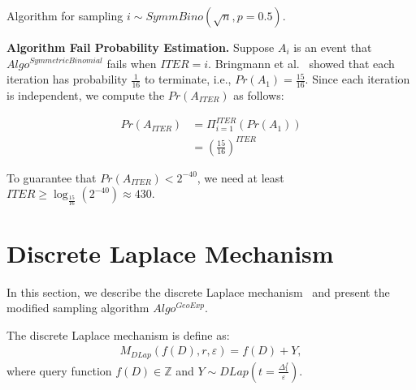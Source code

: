 \begin{algorithm}[tbh!]
{{            \\
            \\
            \\
            \\
            \\
        }}
    \caption{Algorithm for sampling $i\sim SymmBino\left(\sqrt{n} ,p=0.5\right) $.}
    \label{algo:SymmetricBinomialLargeN}
\end{algorithm}
\FloatBarrier

\textbf{Algorithm Fail Probability Estimation. }
Suppose $A_i$ is an event that $Algo^{SymmetricBinomial}$ fails when $ITER=i$.
Bringmann et al.~\cite{Bringmann2014InternalDE} showed that each iteration has probability $\frac{1}{16} $ to terminate, i.e., $Pr\left(A_1\right)=\frac{15}{16} $.
Since each iteration is independent, we compute the $Pr\left(A_{ITER}\right)$ as follows:

\begin{equation}
    \begin{split}
        Pr\left(A_{ITER}\right) &  =  \Pi _{i=1}^{ITER}\left(Pr\left(A_1\right) \right) \\
        &=\left(\frac{15}{16}\right)^{ITER}
    \end{split}
\end{equation}

To guarantee that $Pr\left(A_{ITER}\right)<2^{-40}$, we need at least $ITER\geq \log _\frac{15}{16}\left(2^{-40}\right)\approx 430$.

\section{Discrete Laplace Mechanism}
\label{sec:discreteLaplacemechanism}

In this section, we describe the discrete Laplace mechanism~\cite{chan2012privacy, ghosh2012universally,eigner2014differentially,canonne2020discrete} and present the modified sampling algorithm $Algo^{GeoExp}$.

The discrete Laplace mechanism is define as:
\begin{equation}
    \begin{split}
        M_{DLap}\left(f\left(D\right),r,\varepsilon\right)=f\left(D\right) +Y,
    \end{split}
\end{equation}
where query function $f\left(D\right)\in\mathbb{Z} $ and $Y\sim DLap\left(t=\frac{\Delta_1^{f}}{\varepsilon}\right) $.

